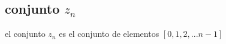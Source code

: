 \subsection{conjunto $z_{n}$}
el conjunto $z_{n}$ es el conjunto de elementos $[0 , 1, 2, . . . n-1]$
